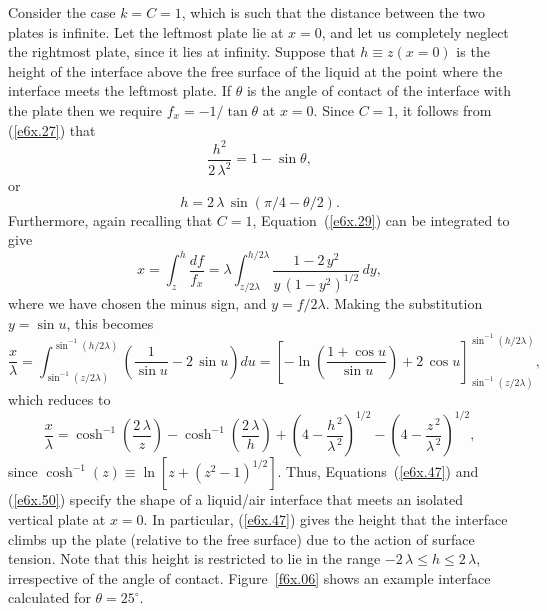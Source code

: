 Consider the case $k=C =1$, which is such that the distance between the two plates is infinite. Let the leftmost plate
lie at $x=0$, and let us completely neglect the rightmost plate, since it lies at infinity. Suppose that $h\equiv z(x=0)$ is the
height of the interface  above the free surface  of the liquid at the point where the interface meets the leftmost plate. 
If $\theta$ is the angle of contact of the interface with the plate then we require $f_x=-1/\tan\theta$ at $x=0$. 
Since $C=1$, it follows from (\ref{e6x.27}) that
\begin{equation}
\frac{h^2}{2\,\lambda^2} = 1-\sin\theta,
\end{equation}
or
\begin{equation}\label{e6x.47}
h=2\,\lambda\,\sin(\pi/4-\theta/2).
\end{equation}
Furthermore, again recalling that $C=1$, Equation~(\ref{e6x.29}) can be integrated to
give
\begin{equation}
x = \int_z^h \frac{df}{f_x}= \lambda \int_{z/2\lambda}^{h/2\lambda}\frac{1-2\,y^2}{y\,(1-y^2)^{1/2}}\,dy,
\end{equation}
where we have chosen the minus sign, and $y=f/2\lambda$. Making the substitution $y=\sin u$, this becomes
\begin{equation}
\frac{x}{\lambda} = \int_{\sin^{-1}(z/2\lambda)}^{\sin^{-1}(h/2\lambda)}\left(\frac{1}{\sin u}- 2\,\sin u\right)du=
\left[-\ln\left(\frac{1+\cos u}{\sin u}\right)+2\,\cos u\right]_{\sin^{-1}(z/2\lambda)}^{\sin^{-1}(h/2\lambda)},
\end{equation}
which reduces to
\begin{equation}\label{e6x.50}
\frac{x}{\lambda} = \cosh^{-1}\left(\frac{2\,\lambda}{z}\right)-\cosh^{-1}\left(\frac{2\,\lambda}{h}\right)
+ \left(4-\frac{h^{\,2}}{\lambda^{\,2}}\right)^{1/2}- \left(4-\frac{z^{\,2}}{\lambda^{\,2}}\right)^{1/2},
\end{equation}
since $\cosh^{-1}(z)\equiv \ln[z+(z^2-1)^{1/2}]$. Thus, Equations~(\ref{e6x.47}) and (\ref{e6x.50})
specify the shape of a liquid/air interface that meets an isolated vertical plate at $x=0$. In particular,
(\ref{e6x.47}) gives the height that the interface climbs up the plate (relative to the free surface) due to the action of
surface tension. Note that this height is restricted to lie in the range $-2\,\lambda\leq h\leq 2\,\lambda$, irrespective
of the angle of contact.
Figure~\ref{f6x.06} shows an example interface calculated for $\theta=25^\circ$. 


